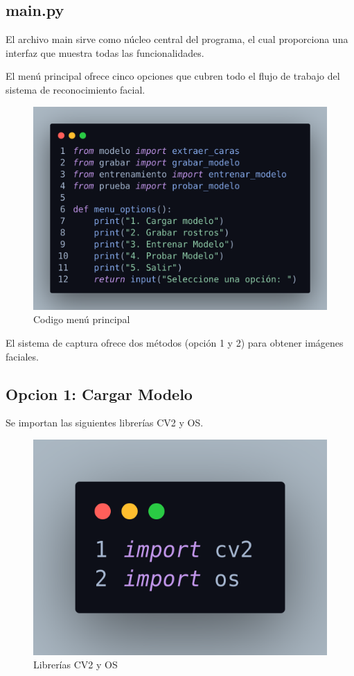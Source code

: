 \documentclass[12pt]{article}
\begin{document}
{\subsection{main.py}
El archivo main sirve como núcleo central del programa, el cual proporciona una interfaz que muestra todas las funcionalidades.

El menú principal ofrece cinco opciones que cubren todo el flujo de trabajo del sistema de reconocimiento facial.
\begin{figure}[h]
    \centering
    \includegraphics[width=0.8\linewidth]{imagenes/des01.png}
    \caption{Codigo menú principal}
    \label{fig:enter-label}
\end{figure}

El sistema de captura ofrece dos métodos (opción 1 y 2) para obtener imágenes faciales.

\subsection{Opcion 1: Cargar Modelo}



Se importan las siguientes librerías CV2 y OS.

\begin{figure}[h]
    \centering
    \includegraphics[width=0.4\linewidth]{imagenes/des02.png}
    \caption{Librerías CV2 y OS}
    \label{fig:enter-label}
\end{figure}

}
\end{document}
